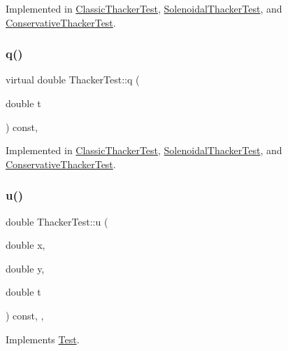 Implemented in \hyperlink{classClassicThackerTest_a485cf3ccda6e8573c83b5e9dca726c13}{Classic\+Thacker\+Test}, \hyperlink{classSolenoidalThackerTest_a15f701fed7e7e58ed0f38b000d0e4c60}{Solenoidal\+Thacker\+Test}, and \hyperlink{classConservativeThackerTest_a86df7e9b8603fbdc5a00341f27428a70}{Conservative\+Thacker\+Test}.

\mbox{\label{classThackerTest_a622e4cd3846a7e6ea906111b6be6a0b7}} 
\subsubsection{\texorpdfstring{q()}{q()}}
{\footnotesize\ttfamily virtual double Thacker\+Test\+::q (\begin{DoxyParamCaption}\item[{double}]{t }\end{DoxyParamCaption}) const\hspace{0.3cm}{\ttfamily [inline]}, {}}



Implemented in \hyperlink{classClassicThackerTest_a732011d2dec24e6c747282391a72ccbf}{Classic\+Thacker\+Test}, \hyperlink{classSolenoidalThackerTest_af0ae968cf43321ae5a6de214c5a9d421}{Solenoidal\+Thacker\+Test}, and \hyperlink{classConservativeThackerTest_a04b3e568727e6ccbfbe5ee13e08cd69c}{Conservative\+Thacker\+Test}.

\mbox{\label{classThackerTest_af791cec82c7e01a575b0aa1fdb03170e}} 
\subsubsection{\texorpdfstring{u()}{u()}}
{\footnotesize\ttfamily double Thacker\+Test\+::u (\begin{DoxyParamCaption}\item[{double}]{x,  }\item[{double}]{y,  }\item[{double}]{t }\end{DoxyParamCaption}) const\hspace{0.3cm}{\ttfamily [inline]}, {\ttfamily [override]}, {\ttfamily [virtual]}}



Implements \hyperlink{classTest_a91fdf3bb74a1fc0e7e95895acb94085a}{Test}.

